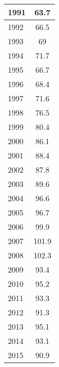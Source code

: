 \documentclass{mcmthesis}
\begin{document}
\begin{appendices}
\begin{minipage}{\textwidth}
\begin{minipage}[t]{0.45\textwidth}
\begin{tabular}{|l|c|}
          1991 & 63.7                       \\ \hline
          1992 & 66.5                       \\ \hline
          1993 & 69                         \\ \hline
          1994 & 71.7                       \\ \hline
          1995 & 66.7                       \\ \hline
          1996 & 68.4                       \\ \hline
          1997 & 71.6                       \\ \hline
          1998 & 76.5                       \\ \hline
          1999 & 80.4                       \\ \hline
          2000 & 86.1                       \\ \hline
          2001 & 88.4                       \\ \hline
          2002 & 87.8                       \\ \hline
          2003 & 89.6                       \\ \hline
          2004 & 96.6                       \\ \hline
          2005 & 96.7                       \\ \hline
          2006 & 99.9                       \\ \hline
          2007 & 101.9                      \\ \hline
          2008 & 102.3                      \\ \hline
          2009 & 93.4                       \\ \hline
          2010 & 95.2                       \\ \hline
          2011 & 93.3                       \\ \hline
          2012 & 91.3                       \\ \hline
          2013 & 95.1                       \\ \hline
          2014 & 93.1                       \\ \hline
          2015 & 90.9                       \\ \hline
          \end{tabular}
    \end{minipage}
 \end{minipage}





\end{appendices}
\end{document}

